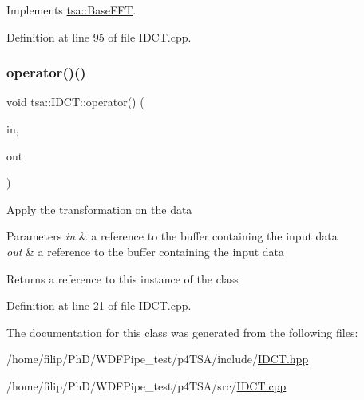 Implements \hyperlink{classtsa_1_1_base_f_f_t_a9af0c36413173821cac8dbdce9cfe3b4}{tsa\+::\+Base\+F\+FT}.



Definition at line 95 of file I\+D\+C\+T.\+cpp.

\mbox{\label{classtsa_1_1_i_d_c_t_a9c1f5bc33388179e85f00882022cf567}} 
\subsubsection{\texorpdfstring{operator()()}{operator()()}}
{\footnotesize\ttfamily void tsa\+::\+I\+D\+C\+T\+::operator() (\begin{DoxyParamCaption}\item[{\hyperlink{namespacetsa_ac599574bcc094eda25613724b8f3ca9e}{Seq\+View\+Double} \&}]{in,  }\item[{\hyperlink{namespacetsa_ac599574bcc094eda25613724b8f3ca9e}{Seq\+View\+Double} \&}]{out }\end{DoxyParamCaption})}

Apply the transformation on the data


\begin{DoxyParams}{Parameters}
{\em in} & a reference to the buffer containing the input data \\
\hline
{\em out} & a reference to the buffer containing the input data\\
\hline
\end{DoxyParams}
\begin{DoxyReturn}{Returns}
a reference to this instance of the class 
\end{DoxyReturn}


Definition at line 21 of file I\+D\+C\+T.\+cpp.



The documentation for this class was generated from the following files\+:\begin{DoxyCompactItemize}
\item 
/home/filip/\+Ph\+D/\+W\+D\+F\+Pipe\+\_\+test/p4\+T\+S\+A/include/\hyperlink{_i_d_c_t_8hpp}{I\+D\+C\+T.\+hpp}\item 
/home/filip/\+Ph\+D/\+W\+D\+F\+Pipe\+\_\+test/p4\+T\+S\+A/src/\hyperlink{_i_d_c_t_8cpp}{I\+D\+C\+T.\+cpp}\end{DoxyCompactItemize}

